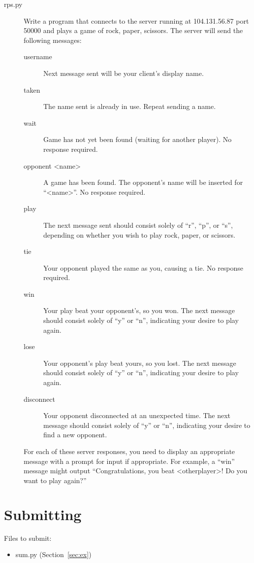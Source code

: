 \documentclass[11pt]{cselabheader}
\begin{document}
\begin{description}
\item[rps.py] Write a program that connects to the server running at 104.131.56.87
  port 50000 and plays a game of rock, paper, scissors. The server will send the
  following messages:
  \begin{description}
  \item[username] Next message sent will be your client's display name.
  \item[taken] The name sent is already in use. Repeat sending a name.
  \item[wait] Game has not yet been found (waiting for another player). No response
    required.
  \item[opponent <name>] A game has been found. The opponent's name will be inserted for ``<name>''. No response required.
  \item[play] The next message sent should consist solely of ``r'', ``p'', or ``s'', depending on whether you wish to play rock, paper, or scissors.
  \item[tie] Your opponent played the same as you, causing a tie. No response required.
  \item[win] Your play beat your opponent's, so you won. The next message should consist solely of ``y'' or ``n'', indicating your desire to play again.
  \item[lose] Your opponent's play beat yours, so you lost. The next message should consist solely of ``y'' or ``n'', indicating your desire to play again.
  \item[disconnect] Your opponent disconnected at an unexpected time. The next message should consist solely of ``y'' or ``n'', indicating your desire to find a new opponent.
  \end{description}

  For each of these server responses, you need to display an appropriate message with a prompt for input if appropriate. For example, a ``win'' message might output ``Congratulations, you beat <otherplayer>! Do you want to play again?''
\end{description}

\pagebreak
\section{Submitting}

Files to submit:
\begin{itemize}
  \item sum.py (Section~\ref{sec:ex})
\end{itemize}
\end{document}
